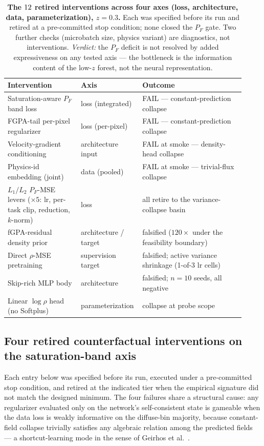 \begin{table}[t]
    \centering
    \footnotesize
    \setlength{\tabcolsep}{4pt}
    \renewcommand{\arraystretch}{1.0}
    \begin{tabular}{@{}p{0.30\linewidth}p{0.20\linewidth}p{0.42\linewidth}@{}}
        \toprule
        \textbf{Intervention} & \textbf{Axis} & \textbf{Outcome} \\
        \midrule
        Saturation-aware $P_F$ band loss & loss (integrated) & FAIL --- constant-prediction collapse \\
        FGPA-tail per-pixel regularizer & loss (per-pixel) & FAIL --- constant-prediction collapse \\
        Velocity-gradient conditioning & architecture input & FAIL at smoke --- density-head collapse \\
        Physics-id embedding (joint) & data (pooled) & FAIL at smoke --- trivial-flux collapse \\
        $L_1/L_2$ $P_F$-MSE levers ($\times 5$: lr, per-task clip, reduction, $k$-norm) & loss & all retire to the variance-collapse basin \\
        fGPA-residual density prior & architecture / target & falsified ($120\times$ under the feasibility boundary) \\
        Direct $\rho$-MSE pretraining & supervision target & falsified; active variance shrinkage (1-of-3 lr cells) \\
        Skip-rich MLP body & architecture & falsified; $n{=}10$ seeds, all negative \\
        Linear $\log\rho$ head (no Softplus) & parameterization & collapse at probe scope \\
        \bottomrule
    \end{tabular}
    \caption{\textbf{The $12$ retired interventions across four axes (loss, architecture, data, parameterization), $z{=}0.3$.} Each was specified before its run and retired at a pre-committed stop condition; none closed the $P_F$ gate. Two further checks (microbatch size, physics variant) are diagnostics, not interventions. \emph{Verdict:} the $P_F$ deficit is not resolved by added expressiveness on any tested axis --- the bottleneck is the information content of the low-$z$ forest, not the neural representation.}
    \label{tab:interventions}
\end{table}

\subsection{Four retired counterfactual interventions on the saturation-band axis}
\label{sec:nextsteps:pf}
Each entry below was specified before its run, executed under a pre-committed stop condition, and retired at the indicated tier when the empirical signature did not match the designed minimum. The four failures share a structural cause: any regularizer evaluated only on the network's self-consistent state is gameable when the data loss is weakly informative on the diffuse-bin majority, because constant-field collapse trivially satisfies any algebraic relation among the predicted fields --- a shortcut-learning mode in the sense of Geirhos et al.~\cite{geirhos2020shortcut}.

